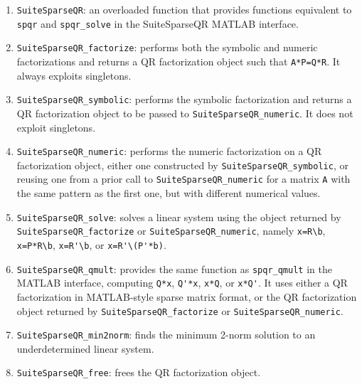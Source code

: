 \documentclass[12pt]{article}
\begin{document}
\begin{enumerate}

    \item \verb'SuiteSparseQR': an overloaded function that provides functions
    equivalent to \verb'spqr' and \verb'spqr_solve' in the SuiteSparseQR MATLAB
    interface.

    \item \verb'SuiteSparseQR_factorize': performs both the symbolic and
    numeric factorizations and returns a QR factorization object such that
    \verb'A*P=Q*R'.  It always exploits singletons.

    \item \verb'SuiteSparseQR_symbolic': performs the symbolic factorization
    and returns a QR factorization object to be passed to
    \verb'SuiteSparseQR_numeric'.  It does not exploit singletons.

    \item \verb'SuiteSparseQR_numeric': performs the numeric factorization on a
    QR factorization object, either one constructed by
    \verb'SuiteSparseQR_symbolic', or reusing one from a prior call to
    \verb'SuiteSparseQR_numeric' for a matrix \verb'A' with the same pattern as
    the first one, but with different numerical values.

    \item \verb'SuiteSparseQR_solve': solves a linear system using the object
    returned by \newline \verb'SuiteSparseQR_factorize' or
    \verb'SuiteSparseQR_numeric', namely \verb"x=R\b", \newline \verb"x=P*R\b",
    \verb"x=R'\b", or \verb"x=R'\(P'*b)".

    \item \verb'SuiteSparseQR_qmult': provides the same function as
    \verb'spqr_qmult' in the MATLAB interface, computing \verb"Q*x",
    \verb"Q'*x", \verb"x*Q", or \verb"x*Q'".  It uses either a QR factorization
    in MATLAB-style sparse matrix format, or the QR factorization object
    returned by \newline \verb'SuiteSparseQR_factorize' or
    \verb'SuiteSparseQR_numeric'.

    \item \verb'SuiteSparseQR_min2norm': finds the minimum 2-norm solution to
    an underdetermined linear system.

    \item \verb'SuiteSparseQR_free': frees the QR factorization object.

\end{enumerate}
\end{document}

